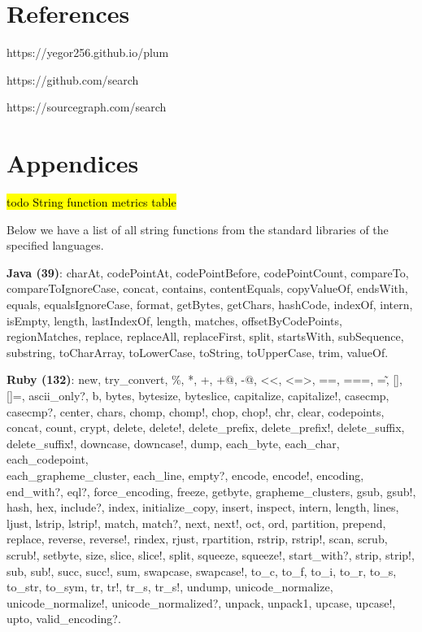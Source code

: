 \documentclass[anonymous,sigplan,review,11pt,nonacm,natbib=false]{acmart}
\begin{document}
    \section{References}

    https://yegor256.github.io/plum

    https://github.com/search

    https://sourcegraph.com/search

    \section{Appendices}

    \hl{todo String function metrics table}

    Below we have a list of all string functions from the standard libraries of the specified languages.

    \textbf{Java (39)}: charAt, codePointAt, codePointBefore, codePointCount, compareTo, compareToIgnoreCase, concat, contains, contentEquals, copyValueOf, endsWith, equals, equalsIgnoreCase, format, getBytes, getChars, hashCode, indexOf, intern, isEmpty, length, lastIndexOf, length, matches, offsetByCodePoints, regionMatches, replace, replaceAll, replaceFirst, split, startsWith, subSequence, substring, toCharArray, toLowerCase, toString, toUpperCase, trim, valueOf.

    \textbf{Ruby (132)}: new, try\_convert, \%, *, +, +@, -@, <<, <=>, ==, ===, =\~, [], []=, ascii\_only?, b, bytes, bytesize, byteslice, capitalize, capitalize!, casecmp, casecmp?, center, chars, chomp, chomp!, chop, chop!, chr, clear, codepoints, concat, count, crypt, delete, delete!, delete\_prefix, delete\_prefix!, delete\_suffix, delete\_suffix!, downcase, downcase!, dump, each\_byte, each\_char, each\_codepoint, \\ each\_grapheme\_cluster, each\_line, empty?, encode, encode!, encoding, end\_with?, eql?, force\_encoding, freeze, getbyte, grapheme\_clusters, gsub, gsub!, hash, hex, include?, index, initialize\_copy, insert, inspect, intern, length, lines, ljust, lstrip, lstrip!, match, match?, next, next!, oct, ord, partition, prepend, replace, reverse, reverse!, rindex, rjust, rpartition, rstrip, rstrip!, scan, scrub, scrub!, setbyte, size, slice, slice!, split, squeeze, squeeze!, start\_with?, strip, strip!, sub, sub!, succ, succ!, sum, swapcase, swapcase!, to\_c, to\_f, to\_i, to\_r, to\_s, to\_str, to\_sym, tr, tr!, tr\_s, tr\_s!, undump, unicode\_normalize, unicode\_normalize!, unicode\_normalized?, unpack, unpack1, upcase, upcase!, upto, valid\_encoding?.
\end{document}
